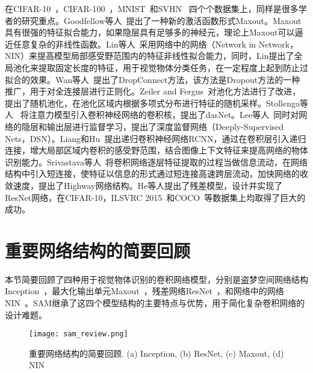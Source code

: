 在CIFAR-10~\cite{krizhevsky2009learning}，CIFAR-100~\cite{krizhevsky2009learning}，MNIST~\cite{lecun1998gradient}和SVHN~\cite{netzer2011reading} 四个个数据集上，同样是很多学者的研究重点。Goodfellow等人~\cite{goodfellow2013maxout}提出了一种新的激活函数形式Maxout。Maxout具有很强的特征拟合能力，如果隐层具有足够多的神经元，理论上Maxout可以逼近任意复杂的非线性函数。Lin等人~\cite{DBLP:journals/corr/LinCY13}采用网络中的网络（Network in Network，NIN）来提高模型局部感受野范围内的特征非线性拟合能力，同时，Lin提出了全局池化来提取固定长度的特征，用于视觉物体分类任务，在一定程度上起到防止过拟合的效果。Wan等人~\cite{wan2013regularization}提出了DropConnect方法，该方法是Dropout方法的一种推广，用于对全连接层进行正则化。Zeiler and Fergus~\cite{zeiler2013stochastic}对池化方法进行了改进，提出了随机池化，在池化区域内根据多项式分布进行特征的随机采样。Stollenga等人~\cite{stollenga2014deep} 将注意力模型引入卷积神经网络的卷积核，提出了dasNet。Lee等人~\cite{lee2014deeply}同时对网络的隐层和输出层进行监督学习，提出了深度监督网络（Deeply-Supervised Nets，DSN）。Liang和Hu~\cite{liang2015recurrent}提出递归卷积神经网络RCNN，通过在卷积层引入递归连接，增大局部区域内卷积的感受野范围，结合图像上下文特征来提高网络的物体识别能力。Srivastava等人~\cite{srivastava2015training}将卷积网络逐层特征提取的过程当做信息流动，在网络结构中引入短连接，使特征以信息的形式通过短连接高速跨层流动，加快网络的收敛速度，提出了Highway网络结构。He等人\cite{he2015deep}提出了残差模型，设计并实现了ResNet网络，在CIFAR-10，ILSVRC 2015~\cite{everingham2010pascal}和COCO~\cite{lin2014microsoft}等数据集上均取得了巨大的成功。

\section{重要网络结构的简要回顾}
\label{sec:sap:review}

本节简要回顾了四种用于视觉物体识别的卷积网络模型，分别是盗梦空间网络结构Inception~\cite{szegedy2014going,szegedy2015rethinking,szegedy2016inception}，最大化输出单元Maxout~\cite{goodfellow2013maxout}，残差网络ResNet~\cite{he2015deep}，和网络中的网络NIN~\cite{DBLP:journals/corr/LinCY13}。SAM继承了这四个模型结构的主要特点与优势，用于简化复杂卷积网络的设计难题。

\begin{figure*}[t]
\centering
\texttt{[image: sam\_review.png]}
\caption{重要网络结构的简要回顾. (a) Inception, (b) ResNet, (c) Maxout, (d) NIN}
\label{fig:sam_review}
\end{figure*}

